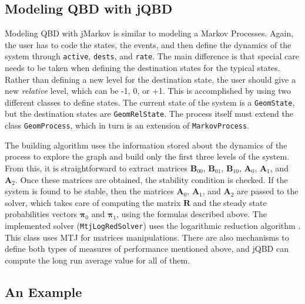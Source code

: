 \documentclass[11pt,letterpaper]{article}
\newcommand{\bA}{{\mathbf A}}
\newcommand{\bB}{{\mathbf B}}
\newcommand{\bR}{{\mathbf R}}
\newcommand{\bpi}{{\boldsymbol{\pi}}}
\newcommand{\Active}{\texttt{active}\xspace}
\newcommand{\Rate}{\texttt{rate}\xspace}
\newcommand{\Dests}{\texttt{dests}\xspace}
\newcommand\MarkovProcess{\texttt{Markov\-Pro\-cess}\xspace}
\newcommand\GeomProcess{\texttt{Geom\-Pro\-cess}\xspace}
\begin{document}
\subsection{Modeling QBD with jQBD}\label{sec:QBDmodule}

Modeling QBD with jMarkov is similar to modeling a Markov Processes. Again, the
user has to code the states, the events, and then define the dynamics of the
system through \Active, \Dests, and \Rate. The main difference is that special
care needs to be taken when defining the destination states for the typical
states. Rather than defining a new level for the destination state, the user
should give a new \textit{relative} level, which can be -1, 0, or +1. This is
accomplished by using two different classes to define states. The current state
of the system is a \texttt{GeomState}, but the destination states are
\texttt{GeomRelState}. The process itself must extend the class \GeomProcess,
which in turn is an extension of \MarkovProcess.

The building algorithm uses the information stored about the dynamics of the
process to explore the graph and build only the first three levels of the
system. From this, it is straightforward to extract matrices $\bB_{00}$,
$\bB_{01}$, $\bB_{10}$, $\bA_0$, $\bA_1$, and $\bA_2$. Once these matrices are
obtained, the stability condition is checked. If the system is found to be
stable, then the matrices $\bA_0$, $\bA_1$, and $\bA_2$ are passed to the
solver, which takes care of computing the matrix $\bR$ and the steady state
probabilities vectors $\bpi_0$ and $\bpi_1$, using the formulas described
above. The implemented solver (\texttt{MtjLogRedSolver}) uses the logarithmic
reduction algorithm \cite{lato.rama99}. This class uses MTJ for matrices
manipulations.  There are also mechanisms to define both types of measures of
performance mentioned above, and jQBD can compute the long run average value for
all of them.


\subsection{An Example} \label{sec:Usage}
\end{document}
